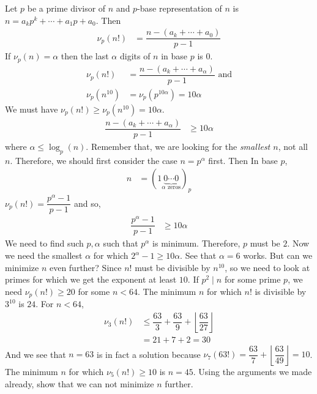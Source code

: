 \documentclass[problems.tex]{subfile}
\begin{document}
	\begin{solution}
		Let $p$ be a prime divisor of $n$ and $p$-base representation of $n$ is $n=a_kp^k+\cdots+a_1p+a_0$. Then
			\begin{align*}
				\nu_p(n!) & = \dfrac{n-(a_k+\cdots+a_0)}{p-1}
			\end{align*}
		If $\nu_p(n)=\alpha $ then the last $\alpha $ digits of $n$ in base $p$ is $0$.
			\begin{align*}
				\nu_p(n!) & = \dfrac{n-(a_k+\cdots+a_{\alpha })}{p-1}\text { and}\\
				\nu_p(n^{10}) & = \nu_p(p^{10\alpha })=10\alpha
			\end{align*}
		We must have $\nu_p(n!)\geq \nu_p(n^{10})=10\alpha$.
			\begin{align*}
				\dfrac{n-(a_k+\cdots+a_\alpha)}{p-1} & \geq10\alpha
			\end{align*}
		where $\alpha\leq\log_p(n)$. Remember that, we are looking for the \textit{smallest $n$}, not all $n$. Therefore, we should first consider the case $n=p^\alpha$ first. Then In base $p$,
			\begin{align*}
				n & = (1\underbrace{0\cdots0}_{\alpha\text { zeros}})_p
			\end{align*}
		$\nu_p(n!) = \dfrac{p^\alpha-1}{p-1}$ and so,
			\begin{align*}
				\dfrac{p^\alpha-1}{p-1} &\geq10\alpha
			\end{align*}
		We need to find such $p,\alpha$ such that $p^\alpha$ is minimum. Therefore, $p$ must be $2$. Now we need the smallest $\alpha$ for which $2^\alpha-1\geq10\alpha $. See that $\alpha = 6$ works. But can we minimize $n$ even further? Since $n!$ must be divisible by $n^{10}$, so we need to look at primes for which we get the exponent at least $10$. If $p^2\mid n$ for some prime $p$, we need $\nu_p(n!)\geq20$ for some $n<64$. The minimum $n$ for which $n!$ is divisible by $3^{10}$ is $24$. For $n<64$,
			\begin{align*}
				\nu_3(n!) & \leq \dfrac{63}{3}+\dfrac{63}{9}+\left\lfloor\dfrac{63}{27}\right\rfloor\\
						  & = 21+7+2=30
			\end{align*}
		And we see that $n=63$ is in fact a solution because $\nu_7(63!) = \dfrac{63}{7}+\left\lfloor\dfrac{63}{49}\right\rfloor=10$. The minimum $n$ for which $\nu_5(n!)\geq10$ is $n=45$. Using the arguments we made already, show that we can not minimize $n$ further.
	\end{solution}
\end{document}
